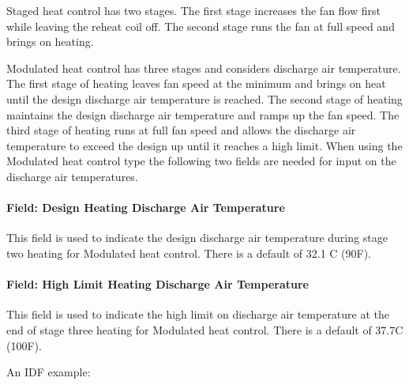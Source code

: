 Staged heat control has two stages. The first stage increases the fan flow first while leaving the reheat coil off.  The second stage runs the fan at full speed and brings on heating.  

Modulated heat control has three stages and considers discharge air temperature.  The first stage of heating leaves fan speed at the minimum and brings on heat until the design discharge air temperature is reached.  The second stage of heating maintains the design discharge air temperature and ramps up the fan speed.  The third stage of heating runs at full fan speed and allows the discharge air temperature to exceed the design up until it reaches a high limit.  When using the Modulated heat control type the following two fields are needed for input on the discharge air temperatures. 

\paragraph{Field: Design Heating Discharge Air Temperature}\label{field-heat-design-DAT-seriesPIU}

This field is used to indicate the design discharge air temperature during stage two heating for Modulated heat control. There is a default of 32.1 C (90F). 

\paragraph{Field: High Limit Heating Discharge Air Temperature}\label{field-heat-limit-DAT-seriesPIU}

This field is used to indicate the high limit on discharge air temperature at the end of stage three heating for Modulated heat control.  There is a default of 37.7C (100F).

An IDF example:

